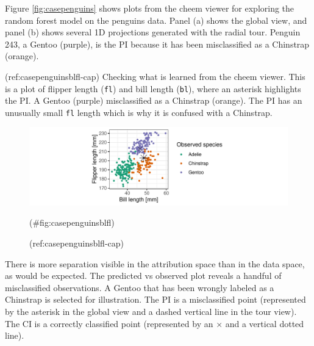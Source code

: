 \documentclass[
]{jss}
\begin{document}
Figure \ref{fig:casepenguins} shows plots from the cheem viewer for exploring the random forest model on the penguins data. Panel (a) shows the global view, and panel (b) shows several 1D projections generated with the radial tour. Penguin 243, a Gentoo (purple), is the PI because it has been misclassified as a Chinstrap (orange).

(ref:casepenguinsblfl-cap) Checking what is learned from the cheem viewer. This is a plot of flipper length (\texttt{fl}) and bill length (\texttt{bl}), where an asterisk highlights the PI. A Gentoo (purple) misclassified as a Chinstrap (orange). The PI has an unusually small \texttt{fl} length which is why it is confused with a Chinstrap.

\begin{CodeChunk}
\begin{figure}

{\centering \includegraphics[width=1\linewidth]{./figures/case_penguins_BlFl} 

}

\caption[(ref:casepenguinsblfl-cap)]{(ref:casepenguinsblfl-cap)}(\#fig:casepenguinsblfl)
\end{figure}
\end{CodeChunk}

There is more separation visible in the attribution space than in the data space, as would be expected. The predicted vs observed plot reveals a handful of misclassified observations. A Gentoo that has been wrongly labeled as a Chinstrap is selected for illustration. The PI is a misclassified point (represented by the asterisk in the global view and a dashed vertical line in the tour view). The CI is a correctly classified point (represented by an \(\times\) and a vertical dotted line).
\end{document}
